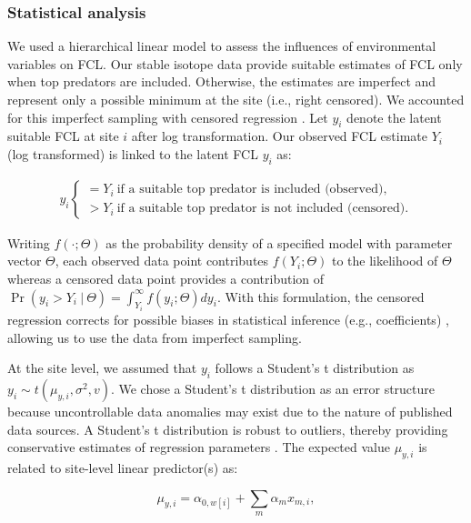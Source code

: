 \documentclass[11pt, class=article, crop=false]{standalone}
\theoremstyle{definition}
\begin{document}
\subsubsection{Statistical analysis}

We used a hierarchical linear model to assess the influences of environmental variables on FCL.
Our stable isotope data provide suitable estimates of FCL only when top predators are included.
Otherwise, the estimates are imperfect and represent only a possible minimum at the site (i.e., right censored).
We accounted for this imperfect sampling with censored regression \citep{terui_stream_2018, lunn_bugs_2012}.
Let $y_i$ denote the latent suitable FCL at site $i$ after log transformation.
Our observed FCL estimate $Y_i$ (log transformed) is linked to the latent FCL $y_i$ as:

\begin{align}
    y_i 
    \begin{cases}
        = Y_i~\text{if a suitable top predator is included (observed)},\\
        > Y_i~\text{if a suitable top predator is not included (censored).}
    \end{cases}
\end{align}

Writing $f(\cdot;\Theta)$ as the probability density of a specified model with parameter vector $\Theta$, each observed data point contributes $f(Y_i;\Theta)$ to the likelihood of $\Theta$ whereas a censored data point provides a contribution of $\Pr(y_i > Y_i~|~\Theta) = \int_{Y_i}^{\infty} f(y_i;\Theta) dy_i$.
With this formulation, the censored regression corrects for possible biases in statistical inference (e.g., coefficients) \citep{terui_stream_2018, lunn_bugs_2012}, allowing us to use the data from imperfect sampling.

At the site level, we assumed that $y_i$ follows a Student's t distribution as $y_i \sim t(\mu_{y,i}, \sigma^2, v)$.
We chose a Student's t distribution as an error structure because uncontrollable data anomalies may exist due to the nature of published data sources.
A Student's t distribution is robust to outliers, thereby providing conservative estimates of regression parameters \citep{lunn_bugs_2012}.
The expected value $\mu_{y,i}$ is related to site-level linear predictor(s) as:

\begin{equation}
    \mu_{y,i} = \alpha_{0, w[i]} + \sum_m \alpha_m x_{m,i},
\end{equation}
\end{document}
